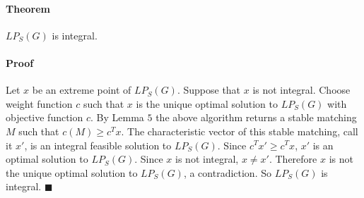 \documentclass[letterpaper,12pt,oneside,onecolumn]{article}
\begin{document}
\paragraph{Theorem}
$LP_S(G)$ is integral.
\paragraph{Proof}
Let $x$ be an extreme point of $LP_S(G)$. Suppose that $x$ is not integral. Choose weight function $c$ such that $x$ is the unique optimal solution to $LP_S(G)$ with objective function $c$. By Lemma $5$ the above algorithm returns a stable matching $M$ such that $c(M) \geq c^Tx$. The characteristic vector of this stable matching, call it $x'$, is an integral feasible solution to $LP_S(G)$. Since $c^Tx' \geq c^Tx$, $x'$ is an optimal solution to $LP_S(G)$. Since $x$ is not integral, $x \neq x'$. Therefore $x$ is not the unique optimal solution to $LP_S(G)$, a contradiction. So $LP_S(G)$ is integral. $\blacksquare$
\end{document}
